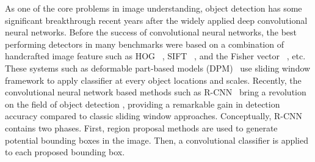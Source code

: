 As one of the core problems in image understanding, object detection has some significant breakthrough recent years after the widely applied deep convolutional neural networks. Before the success of convolutional neural networks, the best performing detectors in many benchmarks were based on a combination of handcrafted image feature such as HOG~\cite{dalal2005histograms} , SIFT~\cite{lowe2004distinctive} , and the Fisher vector~\cite{cinbis2013segmentation} , etc. These systems such as deformable part-based models (DPM)~\cite{felzenszwalb2010object} use sliding window framework to apply classifier at every object locations and scales. Recently, the convolutional neural network based methods such as R-CNN~\cite{girshick2014rich,girshick2015fast} bring a revolution on the field of object detection , providing a remarkable gain in detection accuracy compared to classic sliding window approaches. Conceptually, R-CNN contains two phases. First, region proposal methods are used to generate potential bounding boxes in the image. Then, a convolutional classifier is applied to each proposed bounding box. 
